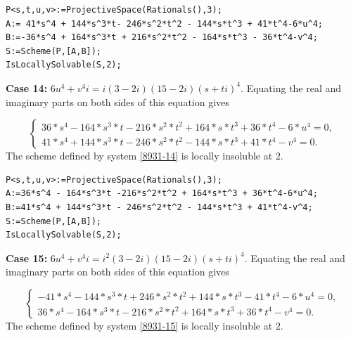\documentclass[a4paper,12pt,english,reqno]{amsart}
\begin{document}
\begin{lstlisting}
P<s,t,u,v>:=ProjectiveSpace(Rationals(),3);
A:= 41*s^4 + 144*s^3*t- 246*s^2*t^2 - 144*s*t^3 + 41*t^4-6*u^4;
B:=-36*s^4 + 164*s^3*t + 216*s^2*t^2 - 164*s*t^3 - 36*t^4-v^4;
S:=Scheme(P,[A,B]);
IsLocallySolvable(S,2);
\end{lstlisting}

{\bf Case 14:} $6u^4+v^4i=i(3-2i)(15-2i)(s+ti)^4$. Equating the real and imaginary parts on both sides of this equation gives

\begin{equation}\label{8931-14}
\begin{cases}
36*s^4 - 164*s^3*t - 216*s^2*t^2 + 164*s*t^3 + 36*t^4 - 6*u^4=0,\\
41*s^4 + 144*s^3*t - 246*s^2*t^2 - 144*s*t^3 + 41*t^4 - v^4=0.
\end{cases}
\end{equation}
The scheme defined by system \eqref{8931-14} is locally insoluble at $2$.

\begin{lstlisting}
P<s,t,u,v>:=ProjectiveSpace(Rationals(),3);
A:=36*s^4 - 164*s^3*t -216*s^2*t^2 + 164*s*t^3 + 36*t^4-6*u^4;
B:=41*s^4 + 144*s^3*t - 246*s^2*t^2 - 144*s*t^3 + 41*t^4-v^4;
S:=Scheme(P,[A,B]);
IsLocallySolvable(S,2);
\end{lstlisting}
{\bf Case 15:} $6u^4+v^4i=i^2(3-2i)(15-2i)(s+ti)^4$.  Equating the real and imaginary parts on both sides of this equation gives

\begin{equation}\label{8931-15}
\begin{cases}
-41*s^4 - 144*s^3*t + 246*s^2*t^2 + 144*s*t^3 - 41*t^4 - 6*u^4=0,\\
36*s^4 - 164*s^3*t - 216*s^2*t^2 + 164*s*t^3 + 36*t^4 - v^4=0.
\end{cases}
\end{equation}
The scheme defined by system \eqref{8931-15} is locally insoluble at $2$.
\end{document}
